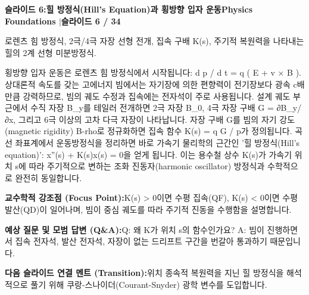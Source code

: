\documentclass[11pt,a4paper]{article}
\begin{document}
\clearpage
\hypertarget{slide.6}{}
{}
\noindent\begin{tcolorbox}[colback=navy,colframe=navy,left=6pt,right=6pt,top=3pt,bottom=3pt,boxrule=0pt,arc=2pt]
{\large\bfseries\color{white}슬라이드 6:\enspace 힐 방정식(Hill's Equation)과 횡방향 입자 운동}\hfill{\footnotesize\bfseries\color{white!85!lightbg}Physics Foundations \enspace$|$\enspace 슬라이드 6 / 34}
\end{tcolorbox}
\vspace{0.2em}
\begin{tcolorbox}[colback=lightbg,colframe=bordergray,title={\footnotesize\bfseries\color{darkgray}슬라이드 시각 구성 요약},fontupper=\small,left=6pt,right=6pt,top=2.5pt,bottom=2.5pt,boxrule=0.6pt,arc=2.5pt]
로렌츠 힘 방정식, 2극/4극 자장 선형 전개, 집속 구배 K(s), 주기적 복원력을 나타내는 힐의 2계 선형 미분방정식.
\end{tcolorbox}
\vspace{0.2em}
\begin{tcolorbox}[colback=white,colframe=primaryblue,title={\footnotesize\bfseries\color{white}발표자 구두 대본 (Spoken Script)},fontupper=\small,left=6pt,right=6pt,top=3pt,bottom=3pt,boxrule=0.8pt,arc=2.5pt]
횡방향 입자 운동은 로렌츠 힘 방정식에서 시작됩니다: d p / d t = q ( E + v × B ). 상대론적 속도를 갖는 고에너지 빔에서는 자기장에 의한 편향력이 전기장보다 광속 c배만큼 강력하므로, 빔의 궤도 수정과 집속에는 전자석이 주로 사용됩니다. 설계 궤도 부근에서 수직 자장 B\_y를 테일러 전개하면 2극 자장 B\_0, 4극 자장 구배 G = ∂B\_y/∂x, 그리고 6극 이상의 고차 다극 자장이 나타납니다. 자장 구배 G를 빔의 자기 강도(magnetic rigidity) B-rho로 정규화하면 집속 함수 K(s) = q G / p가 정의됩니다. 곡선 좌표계에서 운동방정식을 정리하면 바로 가속기 물리학의 근간인 '힐 방정식(Hill's equation)': x''(s) + K(s)x(s) = 0을 얻게 됩니다. 이는 용수철 상수 K(s)가 가속기 위치 s에 따라 주기적으로 변하는 조화 진동자(harmonic oscillator) 방정식과 수학적으로 완전히 동일합니다.
\end{tcolorbox}
\vspace{0.2em}
\begin{tcolorbox}[colback=lightbg,colframe=bordergray,left=6pt,right=6pt,top=3pt,bottom=3pt,boxrule=0.6pt,arc=2.5pt]
\small
\noindent\textbf{\color{navy}교수학적 강조점 (Focus Point):}\enspace K(s) > 0이면 수평 집속(QF), K(s) < 0이면 수평 발산(QD)이 일어나며, 빔이 중심 궤도를 따라 주기적 진동을 수행함을 설명합니다.\par\vspace{0.3em}
\noindent\textbf{\color{successgreen}예상 질문 및 모범 답변 (Q\&A):}\enspace Q: 왜 K가 위치 s의 함수인가요? A: 빔이 진행하면서 집속 전자석, 발산 전자석, 자장이 없는 드리프트 구간을 번갈아 통과하기 때문입니다.\par\vspace{0.3em}
\noindent\textbf{\color{accent}다음 슬라이드 연결 멘트 (Transition):}\enspace 위치 종속적 복원력을 지닌 힐 방정식을 해석적으로 풀기 위해 쿠랑-스나이더(Courant-Snyder) 광학 변수를 도입합니다.
\end{tcolorbox}
\end{document}
